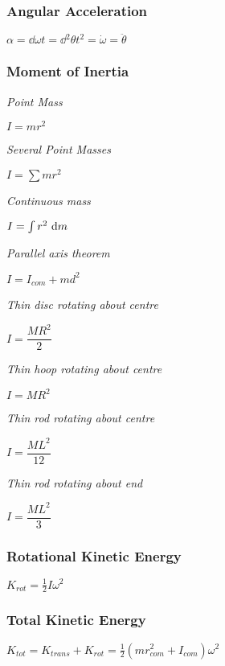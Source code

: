\subsubsection{Angular Acceleration}
\begin{itemize}
\itemt \( \alpha = \dd{\omega}{t} = \dd{^2\theta}{t^2} = \dot{\omega} = \ddot{\theta}\)
\end{itemize}

\subsubsection{Moment of Inertia}
\textit{Point Mass}
\begin{itemize}
\itemt \( I = mr^2 \)
\end{itemize}
\textit{Several Point Masses}
\begin{itemize}
\itemt \( I = \sum mr^2 \)
\end{itemize}
\textit{Continuous mass}
\begin{itemize}
\itemt \( I = \int r^2 \ \mathrm{d}m \)
\end{itemize}
\textit{Parallel axis theorem}
\begin{itemize}
\itemt \( I = I_{com} + md^2 \)
\end{itemize}
\textit{Thin disc rotating about centre}
\begin{itemize}
\itemt \( I = \dfrac{MR^2}{2} \)
\end{itemize}
\textit{Thin hoop rotating about centre}
\begin{itemize}
\itemt \( I = MR^2 \)
\end{itemize}
\textit{Thin rod rotating about centre}
\begin{itemize}
\itemt \( I = \dfrac{ML^2}{12} \)
\end{itemize}
\textit{Thin rod rotating about end}
\begin{itemize}
\itemt \( I = \dfrac{ML^2}{3} \)
\end{itemize}


\subsubsection{Rotational Kinetic Energy}
\begin{itemize}
\itemt \( K_{rot} = \frac{1}{2} I \omega^2 \)
\end{itemize}

\subsubsection{Total Kinetic Energy}
\begin{itemize}
\itemt \( K_{tot} = K_{trans} + K_{rot} = \frac{1}{2} (mr_{com}^2 + I_{com})\omega^2 \)
\end{itemize}

